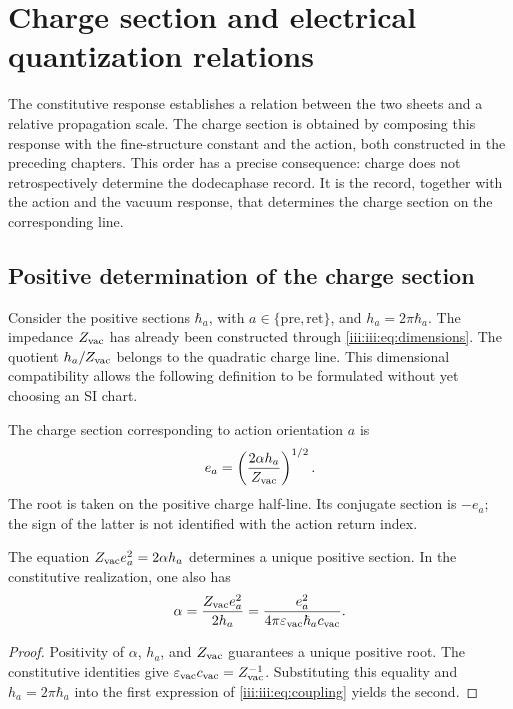 \section{Charge section and electrical quantization relations}
\label{iii:iii:sec:carga}

The constitutive response establishes a relation between the two sheets and a
relative propagation scale. The charge section is obtained by composing
this response with the fine-structure constant and the action, both
constructed in the preceding chapters. This order has a precise
consequence: charge does not retrospectively determine the dodecaphase record.
It is the record, together with the action and the vacuum response, that
determines the charge section on the corresponding line.

\subsection{Positive determination of the charge section}

Consider the positive sections $\hbar_a$, with
$a\in\{\mathrm{pre},\mathrm{ret}\}$, and $h_a=2\pi\hbar_a$.
The impedance $Z_{\rm vac}$ has already been constructed through
\eqref{iii:iii:eq:dimensions}. The quotient $h_a/Z_{\rm vac}$ belongs to
the quadratic charge line. This dimensional compatibility allows
the following definition to be formulated without yet choosing an SI chart.

\begin{definition}
The charge section corresponding to action orientation $a$ is
\begin{equation}
 e_a=\left(\frac{2\alpha h_a}{Z_{\rm vac}}\right)^{1/2}.
 \label{iii:iii:eq:charge}
\end{equation}
The root is taken on the positive charge half-line. Its conjugate section
is $-e_a$; the sign of the latter is not identified with the action
return index.
\end{definition}

\begin{proposition}
The equation $Z_{\rm vac}e_a^2=2\alpha h_a$ determines a unique
positive section. In the constitutive realization, one also has
\begin{equation}
 \alpha=\frac{Z_{\rm vac}e_a^2}{2h_a}
 =\frac{e_a^2}{4\pi\varepsilon_{\rm vac}\hbar_a c_{\rm vac}}.
 \label{iii:iii:eq:coupling}
\end{equation}
\end{proposition}
\begin{proof}
Positivity of $\alpha$, $h_a$, and $Z_{\rm vac}$ guarantees a unique
positive root. The constitutive identities give
$\varepsilon_{\rm vac}c_{\rm vac}=Z_{\rm vac}^{-1}$.
Substituting this equality and $h_a=2\pi\hbar_a$ into the first expression
of \eqref{iii:iii:eq:coupling} yields the second.
\end{proof}

